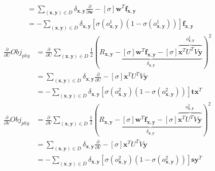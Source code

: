 \documentclass[11pt,a4paper]{article}
\newcommand{\Obj}{\mathit{Obj}}
\newcommand{\phy}{\mathit{phy}}
\newcommand{\x}{\vec{x}}
\newcommand{\y}{\vec{y}}
\newcommand{\w}{\vec{w}}
\newcommand{\f}{\vec{f}}
\newcommand{\s}{\vec{s}}
\renewcommand{\t}{\vec{t}}
\renewcommand{\vec}[1]{\mathbf{#1}}
\begin{document}
\begin{itemize}
\begin{align*}
& = \sum_{(\x,\y) \in D} \delta_{\x,\y} \frac{\partial}{\partial \w} - [\sigma] \w^T \f_{\x,\y} \\
& = - \sum_{(\x,\y) \in D} \delta_{\x,\y} [\sigma(o^1_{\x,\y}) (1 - \sigma(o^1_{\x,\y}))] \f_{\x,\y} 
\end{align*}
\begin{align*}
\frac{\partial}{\partial U} \Obj_\phy & = \frac{\partial}{\partial U} \sum_{(\x,\y) \in D} \frac{1}{2} \left( \underbrace{R_{\x,\y} - [\sigma] \w^T \f_{\x,\y} - [\sigma] \overbrace{\x^T U^T V\y}^{o^2_{\x,\y}}}_{\delta_{\x,\y}}\right)^2 \\
& = \sum_{(\x,\y) \in D} \delta_{\x,\y} \frac{\partial}{\partial U} - [\sigma] \x^T U^T V\y \\
& = - \sum_{(\x,\y) \in D} \delta_{\x,\y} [\sigma(o^2_{\x,\y}) (1 - \sigma(o^2_{\x,\y}))] \t \x^T\\
\frac{\partial}{\partial V} \Obj_\phy & = \frac{\partial}{\partial V} \sum_{(\x,\y) \in D} \frac{1}{2} \left( \underbrace{R_{\x,\y} - [\sigma] \w^T \f_{\x,\y} - [\sigma] \overbrace{\x^T U^T V\y}^{o^2_{\x,\y}}}_{\delta_{\x,\y}}\right)^2 \\
& = \sum_{(\x,\y) \in D}  \delta_{\x,\y} \frac{\partial}{\partial V} - [\sigma] \x^T U^T V\y \\
& = - \sum_{(\x,\y) \in D}  \delta_{\x,\y} [\sigma(o^2_{\x,\y}) (1 - \sigma(o^2_{\x,\y}))] \s \y^T \\
\end{align*}
\end{itemize}
\end{document}
